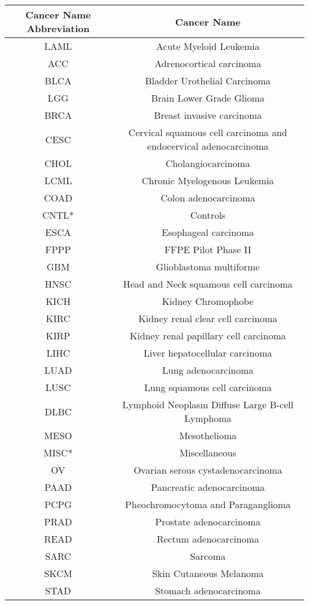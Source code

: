 \begin{table}[ht!]
\centering
\begin{tabular}{cc}
\toprule
\textbf{Cancer Name Abbreviation} & \textbf{Cancer Name} \\
\midrule
LAML & Acute Myeloid Leukemia \\
ACC & Adrenocortical carcinoma \\
BLCA & Bladder Urothelial Carcinoma \\
LGG & Brain Lower Grade Glioma \\
BRCA & Breast invasive carcinoma \\
CESC & Cervical squamous cell carcinoma and endocervical adenocarcinoma \\
CHOL & Cholangiocarcinoma \\
LCML & Chronic Myelogenous Leukemia \\
COAD & Colon adenocarcinoma \\
CNTL* & Controls \\
ESCA & Esophageal carcinoma \\
FPPP & FFPE Pilot Phase II \\
GBM & Glioblastoma multiforme \\
HNSC & Head and Neck squamous cell carcinoma \\
KICH & Kidney Chromophobe \\
KIRC & Kidney renal clear cell carcinoma \\
KIRP & Kidney renal papillary cell carcinoma \\
LIHC & Liver hepatocellular carcinoma \\
LUAD & Lung adenocarcinoma \\
LUSC & Lung squamous cell carcinoma \\
DLBC & Lymphoid Neoplasm Diffuse Large B-cell Lymphoma \\
MESO & Mesothelioma \\
MISC* & Miscellaneous \\
OV & Ovarian serous cystadenocarcinoma \\
PAAD & Pancreatic adenocarcinoma \\
PCPG & Pheochromocytoma and Paraganglioma \\
PRAD & Prostate adenocarcinoma \\
READ & Rectum adenocarcinoma \\
SARC & Sarcoma \\
SKCM & Skin Cutaneous Melanoma \\
STAD & Stomach adenocarcinoma \\

\end{tabular}
\end{table}
